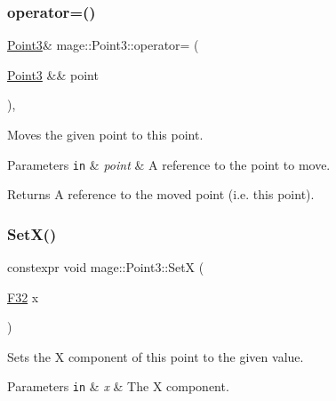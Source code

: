 \subsubsection{\texorpdfstring{operator=()}{operator=()}\hspace{0.1cm}{\footnotesize\ttfamily [2/2]}}
{\footnotesize\ttfamily \mbox{\hyperlink{structmage_1_1_point3}{Point3}}\& mage\+::\+Point3\+::operator= (\begin{DoxyParamCaption}\item[{\mbox{\hyperlink{structmage_1_1_point3}{Point3}} \&\&}]{point }\end{DoxyParamCaption})\hspace{0.3cm}{\ttfamily [default]}, {\ttfamily [noexcept]}}

Moves the given point to this point.


\begin{DoxyParams}[1]{Parameters}
\mbox{\tt in}  & {\em point} & A reference to the point to move. \\
\hline
\end{DoxyParams}
\begin{DoxyReturn}{Returns}
A reference to the moved point (i.\+e. this point). 
\end{DoxyReturn}
\mbox{\label{structmage_1_1_point3_a62c79c14704a8f53e571d693aafa8471}} 
\subsubsection{\texorpdfstring{Set\+X()}{SetX()}}
{\footnotesize\ttfamily constexpr void mage\+::\+Point3\+::\+SetX (\begin{DoxyParamCaption}\item[{\mbox{\hyperlink{namespacemage_aa97e833b45f06d60a0a9c4fc22ae02c0}{F32}}}]{x }\end{DoxyParamCaption})\hspace{0.3cm}{\ttfamily [noexcept]}}

Sets the X component of this point to the given value.


\begin{DoxyParams}[1]{Parameters}
\mbox{\tt in}  & {\em x} & The X component. \\
\hline
\end{DoxyParams}
\mbox{\label{structmage_1_1_point3_a7ac2ea5fcd095cf86efa1597c0da270d}} 
